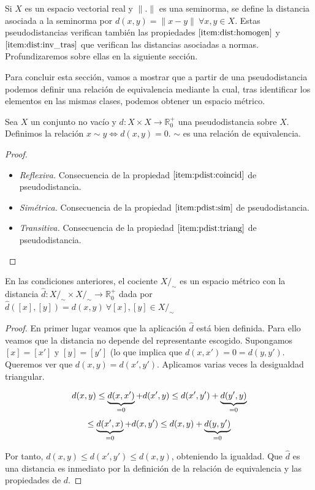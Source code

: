 \begin{example}
    Si $X$ es un espacio vectorial real y $\|.\|$ es una seminorma, se define la distancia asociada a la seminorma por $d(x,y)=\|x-y\| \ \forall x,y\in X$. Estas pseudodistancias verifican también las propiedades $\ref{item:dist:homogen}$ y $\ref{item:dist:inv_tras}$ que verifican las distancias asociadas a normas. Profundizaremos sobre ellas en la siguiente sección.
\end{example}

Para concluir esta sección, vamos a mostrar que a partir de una pseudodistancia podemos definir una relación de equivalencia mediante la cual, tras identificar los elementos en las mismas clases, podemos obtener un espacio métrico.

\begin{prop}
    Sea $X$ un conjunto no vacío y $d:X\times X \to \mathbb{R}^+_0$ una pseudodistancia sobre $X$. Definimos la relación $x \sim y \iff d(x,y)=0$. $\sim$ es una relación de equivalencia.
\end{prop}

\begin{proof}
$ $ \newline
\begin{itemize}
    \item \emph{Reflexiva.} Consecuencia de la propiedad $\ref{item:pdist:coincid}$ de pseudodistancia.
    \item \emph{Simétrica.} Consecuencia de la propiedad $\ref{item:pdist:sim}$ de pseudodistancia.
    \item \emph{Transitiva.} Consecuencia de la propiedad $\ref{item:pdist:triang}$ de pseudodistancia.
\end{itemize}

\end{proof}

\begin{thm} \label{thm:quotient_dist}

En las condiciones anteriores, el cociente $X/_\sim$ es un espacio métrico con la distancia $\hat{d}:X/_\sim \times X/_\sim \to \mathbb{R}^+_0$ dada por $\hat{d}([x],[y])=d(x,y) \ \forall[x],[y] \in X/_\sim$

\end{thm}

\begin{proof}

En primer lugar veamos que la aplicación $\hat{d}$ está bien definida. Para ello veamos que la distancia no depende del representante escogido. Supongamos $[x]=[x']$ y $[y]=[y']$ (lo que implica que $d(x,x')=0=d(y,y')$. Queremos ver que $d(x,y)=d(x',y')$. Aplicamos varias veces la desigualdad triangular.

\[d(x,y)\le \underbrace{d(x,x')}_{=0}+d(x',y) \le d(x',y')+\underbrace{d(y',y)}_{=0}\]
\[\le \underbrace{d(x',x)}_{=0}+d(x,y') \le d(x,y) + \underbrace{d(y,y')}_{=0} \]

Por tanto, $d(x,y) \le d(x',y') \le d(x,y)$, obteniendo la igualdad. Que $\hat{d}$ es una distancia es inmediato por la definición de la relación de equivalencia y las propiedades de $d$.

\end{proof}

